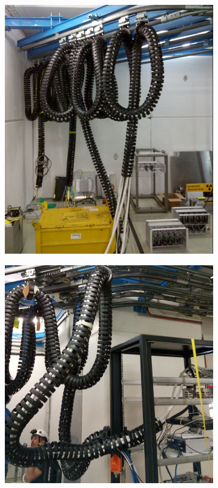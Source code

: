 \begin{figure}
\centering
\begin{subfigure}{.5\textwidth}
  \centering
  \includegraphics[width=.9\linewidth]{./images/cable_chain_storage}
  \caption{}
  \label{fig:cable_chain1}
\end{subfigure}%
\begin{subfigure}{.5\textwidth}
  \centering
  \includegraphics[width=.9\linewidth]{./images/cable_chain_to_rack}

\end{subfigure}
\end{figure}

